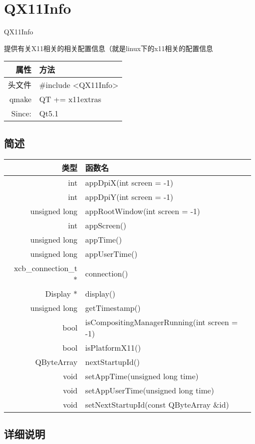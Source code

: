 \chapter{QX11Info}

QX11Info


提供有关X11相关的相关配置信息（就是linux下的x11相关的配置信息

\begin{tabular}{|r|l|}
	\hline
	属性 & 方法 \\
	\hline
	头文件 & \#include <QX11Info>\\      
	\hline
	qmake & QT += x11extras\\      
	\hline
    Since: & Qt5.1\\
    \hline
\end{tabular}


\section{简述}

\begin{tabular}{|r|l|}
\hline
类型 & 函数名 \\
\hline
int	& appDpiX(int screen = -1)\\
\hline
int	& appDpiY(int screen = -1) \\
\hline
unsigned long&	appRootWindow(int screen = -1) \\
\hline
int	&appScreen() \\
\hline
unsigned long&	appTime() \\ 
\hline
unsigned long&	appUserTime() \\
\hline
xcb\_connection\_t *	& connection() \\ 
\hline
Display *	&display()\\
\hline
unsigned long &	getTimestamp()\\
\hline
bool &	isCompositingManagerRunning(int screen = -1)\\
\hline
bool &	isPlatformX11() \\ 
\hline
QByteArray	& nextStartupId() \\
\hline
void &	setAppTime(unsigned long time)\\
\hline
void&	setAppUserTime(unsigned long time)\\
\hline
void&	setNextStartupId(const QByteArray \&id)\\
\hline
\end{tabular}

\section{详细说明}

